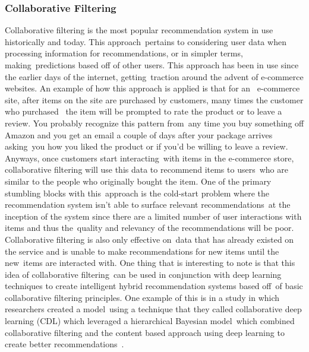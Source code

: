 \documentclass[letterpaper,12pt]{article}
\begin{document}
\subsubsection{Collaborative Filtering}
Collaborative filtering is the most popular recommendation system in use historically and today. This approach\
pertains to considering user data when processing information for recommendations, or in simpler terms, making\
predictions based off of other users. This approach has been in use since the earlier days of the internet, getting\
traction around the advent of e-commerce websites. An example of how this approach is applied is that for an \
e-commerce site, after items on the site are purchased by customers, many times the customer who purchased \
the item will be prompted to rate the product or to leave a review. You probably recognize this pattern from\
any time you buy something off Amazon and you get an email a couple of days after your package arrives asking\
you how you liked the product or if you'd be willing to leave a review. Anyways, once customers start interacting\
with items in the e-commerce store, collaborative filtering will use this data to recommend items to users\
who are similar to the people who originally bought the item. One of the primary stumbling blocks with this\
approach is the cold-start problem where the recommendation system isn't able to surface relevant recommendations\
at the inception of the system since there are a limited number of user interactions with items and thus the\
quality and relevancy of the recommendations will be poor. \cite{wang2017dynamic} Collaborative filtering is also only effective on\
data that has already existed on the service and is unable to make recommendations for new items until the new\
items are interacted with. One thing that is interesting to note is that this idea of collaborative filtering\
can be used in conjunction with deep learning techniques to create intelligent hybrid recommendation systems based off\
of basic collaborative filtering principles. One example of this is in a study in which researchers created a model\
using a technique that they called collaborative deep learning (CDL) which leveraged a hierarchical Bayesian model\
which combined collaborative filtering and the content based approach using deep learning to create better recommendations\
. \cite{Wang2015}
\end{document}
